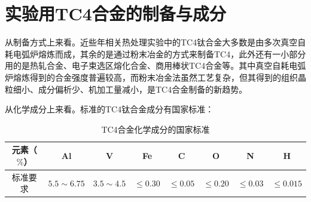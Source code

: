 \documentclass[
class = book,
zihao = -4,
font = noto,
paper = a4paper,
openany
]{easybook}
\begin{document}
\section{实验用TC4合金的制备与成分}
从制备方式上来看。近些年相关热处理实验中的TC4钛合金大多数是由{多次真空自耗电弧炉熔炼}\cite{renchiqiangGurongshixiaoduiTC4taihejinxianweizuzhihelixuexingnengdeyingxiang2022,ranxingGurongwenduduiTi6Al4VELItaihejinxianweizuzhijixingnengdeyingxiang2021,lilouGurongshixiaoduiTC4hejinzuzhiyujixiexingnengdeyingxiang2014,jingranGurongshixiaoduiTC4hejinzuzhiyuxingnengdeyingxiang2018}而成，其余的是通过粉末冶金\cite{zhanghaoyinGurongShixiaoduiTC4taihejinzuzhihelixuexingnengdeyingxiang2014,xujianGurongshixiaogongyiduiTC4taihejinzuzhijixingnengdeyingxiang2014}的方式来制备TC4，此外还有一小部分用的是热轧合金\cite{LiuWanYingBuTongReChuLiGongYiDuiTi6Al4VTaiHeJinWeiGuanJieGouHeLiXueXingNengYingXiangYingWen2017}、电子束选区熔化合金\cite{leijunleDianzishuxuanquronghuachengxingTC4hejinxianweizuzhiyuxingnengdeyanjiujinzhan2022}、商用棒状TC4合金\cite{LuYuanYuanShiXiaoChuLiDuiTC4TaiHeJinWeiGuanZuZhiHeLiXueXingNengDeYingXiang2019}等。其中真空自耗电弧炉熔炼得到的合金强度普遍较高，而粉末冶金法虽然工艺复杂，但其得到的组织晶粒细小、成分偏析少、机加工量减小，是TC4合金制备的新趋势。

从化学成分上来看。标准的TC4钛合金成分有国家标准：
\begin{table}[htbp]
	\centering
	\label{sec:mytc4chem}
	\caption{TC4合金化学成分的国家标准}
	\begin{tabular}{cccccccc}
		\toprule
		元素（$ \% $） & Al & V &Fe &C& O& N &H \\ \midrule
		标准要求 &$ 5.5\sim 6.75 $ & $ 3.5\sim 4.5 $&$ \le 0.30 $ & $ \le 0.05 $&$ \le 0.20 $&$ \le 0.03$ &$ \le 0.015 $  \\ \bottomrule
	\end{tabular}
\end{table}
\end{document}
